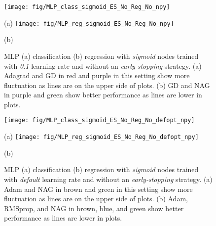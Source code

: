 \documentclass[11pt,a4paper]{article}
\begin{document}
\begin{figure}
        \centering
        \texttt{[image: fig/MLP\_class\_sigmoid\_ES\_No\_Reg\_No\_npy]}
        \label{fig:..}


        (a)
        \centering
        \texttt{[image: fig/MLP\_reg\_sigmoid\_ES\_No\_Reg\_No\_npy]}
        
        (b)
        \caption{MLP (a) classification (b) regression with \textit{sigmoid} nodes trained with \textit{0.1} learning rate  and without an \textit{early-stopping} strategy. (a) Adagrad and GD in red and purple in this setting show more fluctuation as lines are on the upper side of plots. (b) GD and NAG in purple and green show better performance as lines are lower in plots.
        \label{fig:MLP_Sig_ES_No_lr1}}
    \end{figure}
    
\begin{figure}
        \centering
        \texttt{[image: fig/MLP\_class\_sigmoid\_ES\_No\_Reg\_No\_defopt\_npy]}


        (a)
        \centering
        \texttt{[image: fig/MLP\_reg\_sigmoid\_ES\_No\_Reg\_No\_defopt\_npy]}
        
        (b)
        \caption{MLP (a) classification (b) regression with \textit{sigmoid} nodes trained with \textit{default} learning rate  and without an \textit{early-stopping} strategy. (a) Adam and NAG in brown and green in this setting show more fluctuation as lines are on the upper side of plots. (b) Adam, RMSprop, and NAG in brown, blue, and green show better performance as lines are lower in plots.
        \label{fig:MLP_Sig_ES_No_lrD}}
    \end{figure}
    
\newpage
\end{document}
